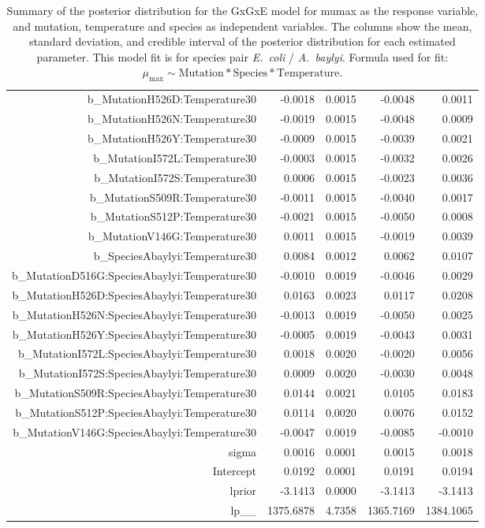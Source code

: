 \begin{table}[ht]
\begin{tabular}{rrrrr}
  b\_MutationH526D:Temperature30 & -0.0018 & 0.0015 & -0.0048 & 0.0011 \\ 
  b\_MutationH526N:Temperature30 & -0.0019 & 0.0015 & -0.0048 & 0.0009 \\ 
  b\_MutationH526Y:Temperature30 & -0.0009 & 0.0015 & -0.0039 & 0.0021 \\ 
  b\_MutationI572L:Temperature30 & -0.0003 & 0.0015 & -0.0032 & 0.0026 \\ 
  b\_MutationI572S:Temperature30 & 0.0006 & 0.0015 & -0.0023 & 0.0036 \\ 
  b\_MutationS509R:Temperature30 & -0.0011 & 0.0015 & -0.0040 & 0.0017 \\ 
  b\_MutationS512P:Temperature30 & -0.0021 & 0.0015 & -0.0050 & 0.0008 \\ 
  b\_MutationV146G:Temperature30 & 0.0011 & 0.0015 & -0.0019 & 0.0039 \\ 
  b\_SpeciesAbaylyi:Temperature30 & 0.0084 & 0.0012 & 0.0062 & 0.0107 \\ 
  b\_MutationD516G:SpeciesAbaylyi:Temperature30 & -0.0010 & 0.0019 & -0.0046 & 0.0029 \\ 
  b\_MutationH526D:SpeciesAbaylyi:Temperature30 & 0.0163 & 0.0023 & 0.0117 & 0.0208 \\ 
  b\_MutationH526N:SpeciesAbaylyi:Temperature30 & -0.0013 & 0.0019 & -0.0050 & 0.0025 \\ 
  b\_MutationH526Y:SpeciesAbaylyi:Temperature30 & -0.0005 & 0.0019 & -0.0043 & 0.0031 \\ 
  b\_MutationI572L:SpeciesAbaylyi:Temperature30 & 0.0018 & 0.0020 & -0.0020 & 0.0056 \\ 
  b\_MutationI572S:SpeciesAbaylyi:Temperature30 & 0.0009 & 0.0020 & -0.0030 & 0.0048 \\ 
  b\_MutationS509R:SpeciesAbaylyi:Temperature30 & 0.0144 & 0.0021 & 0.0105 & 0.0183 \\ 
  b\_MutationS512P:SpeciesAbaylyi:Temperature30 & 0.0114 & 0.0020 & 0.0076 & 0.0152 \\ 
  b\_MutationV146G:SpeciesAbaylyi:Temperature30 & -0.0047 & 0.0019 & -0.0085 & -0.0010 \\ 
  sigma & 0.0016 & 0.0001 & 0.0015 & 0.0018 \\ 
  Intercept & 0.0192 & 0.0001 & 0.0191 & 0.0194 \\ 
  lprior & -3.1413 & 0.0000 & -3.1413 & -3.1413 \\ 
  lp\_\_ & 1375.6878 & 4.7358 & 1365.7169 & 1384.1065 \\ 
   \hline
\end{tabular}
\endgroup
\caption{Summary of the posterior distribution for the GxGxE model for mumax as the response variable, and mutation, temperature and species as independent variables. The columns show the mean, standard deviation, and credible interval of the posterior distribution for each estimated parameter. This model fit is for species pair \textit{E.~coli} / \textit{A.~baylyi}. Formula used for fit: $\mu_{\text{max}} \sim \text{Mutation} * \text{Species} * \text{Temperature}$.} 
\label{supptab:GxGxE_mumax}
\end{table}



